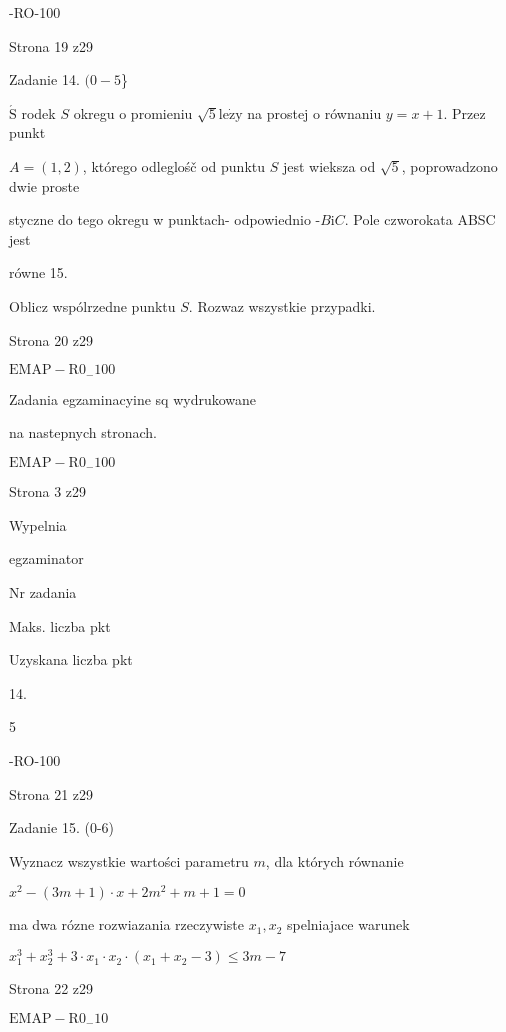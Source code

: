 \documentclass[a4paper,12pt]{article}
\begin{document}
-RO-100

Strona 19 z29





Zadanie 14. $(0-5$\}

$\acute{\mathrm{S}}$ rodek $S$ okregu o promieniu $\sqrt{5} \mathrm{l}\mathrm{e}\dot{\mathrm{z}}\mathrm{y}$ na prostej o równaniu $y=x+1$. Przez punkt

$A=(1,2)$, którego odleglośč od punktu $S$ jest wieksza od $\sqrt{5}$, poprowadzono dwie proste

styczne do tego okregu w punktach- odpowiednio -$B \mathrm{i} C$. Pole czworokata ABSC jest

równe 15.

Oblicz wspólrzedne punktu $S$. Rozwaz wszystkie przypadki.

Strona 20 z29

$\mathrm{E}\mathrm{M}\mathrm{A}\mathrm{P}-\mathrm{R}0_{-}100$





Zadania egzaminacyine sq wydrukowane

na nastepnych stronach.

$\mathrm{E}\mathrm{M}\mathrm{A}\mathrm{P}-\mathrm{R}0_{-}100$

Strona 3 z29





Wypelnia

egzaminator

Nr zadania

Maks. liczba pkt

Uzyskana liczba pkt

14.

5

-RO-100

Strona 21 z29





Zadanie 15. (0-6)

Wyznacz wszystkie wartości parametru $m$, dla których równanie

$x^{2}-(3m+1)\cdot x+2m^{2}+m+1=0$

ma dwa rózne rozwiazania rzeczywiste $x_{1}, x_{2}$ spelniajace warunek

$x_{1}^{3}+x_{2}^{3}+3\cdot x_{1}\cdot x_{2}\cdot(x_{1}+x_{2}-3)\leq 3m-7$

Strona 22 z29

$\mathrm{E}\mathrm{M}\mathrm{A}\mathrm{P}-\mathrm{R}0_{-}10$
\end{document}
